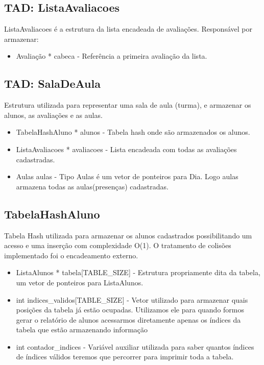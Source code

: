 \documentclass{article}
\begin{document}
\subsection{TAD: ListaAvaliacoes}
ListaAvaliacoes é a estrutura da lista encadeada de avaliações. Responsável por armazenar:
\begin{itemize}
    \item Avaliação * cabeca - Referência a primeira avaliação da lista.
\end{itemize}

\subsection{TAD: SalaDeAula}
Estrutura utilizada para representar uma sala de aula (turma), e armazenar os alunos, as avaliações e as aulas.
\begin{itemize}
    \item TabelaHashAluno * alunos - Tabela hash onde são armazenados os alunos.
    \item ListaAvaliacoes * avaliacoes - Lista encadeada com todas as avaliações cadastradas.
    \item Aulas aulas - Tipo Aulas é um vetor de ponteiros para Dia. Logo aulas armazena todas as aulas(presenças) cadastradas.
\end{itemize}

\subsection{TabelaHashAluno}
Tabela Hash utilizada para armazenar os alunos cadastrados possibilitando um acesso e uma inserção com complexidade O(1). O tratamento de colisões implementado foi o encadeamento externo.
\begin{itemize}
    \item ListaAlunos * tabela[TABLE\_SIZE] - Estrutura propriamente dita da tabela, um vetor de ponteiros para ListaAlunos.
    \item int indices\_validos[TABLE\_SIZE] - Vetor utilizado para armazenar quais posições da tabela já estão ocupadas. Utilizamos ele para quando formos gerar o relatório de alunos acessarmos diretamente apenas os índices da tabela que estão armazenando informação
    \item int contador\_indices - Variável auxiliar utilizada para saber quantos índices de índices válidos teremos que percorrer para imprimir toda a tabela.
\end{itemize}
\end{document}
